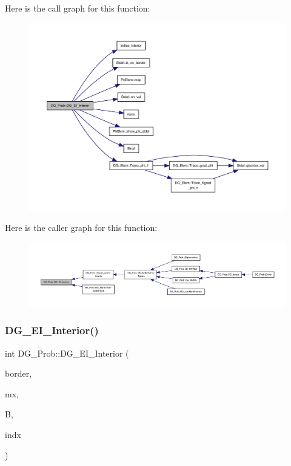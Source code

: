 Here is the call graph for this function\+:
\nopagebreak
\begin{figure}[H]
\begin{center}
\leavevmode
\includegraphics[width=350pt]{classDG__Prob_a862dcc9991b9091de30323b1d2b1c5a5_cgraph}
\end{center}
\end{figure}
Here is the caller graph for this function\+:
\nopagebreak
\begin{figure}[H]
\begin{center}
\leavevmode
\includegraphics[width=350pt]{classDG__Prob_a862dcc9991b9091de30323b1d2b1c5a5_icgraph}
\end{center}
\end{figure}
\mbox{\label{classDG__Prob_ac3054c910c2a6465c71f208b0e2b79ff}} 
\subsubsection{\texorpdfstring{D\+G\+\_\+\+E\+I\+\_\+\+Interior()}{DG\_EI\_Interior()}\hspace{0.1cm}{\footnotesize\ttfamily [2/2]}}
{\footnotesize\ttfamily int D\+G\+\_\+\+Prob\+::\+D\+G\+\_\+\+E\+I\+\_\+\+Interior (\begin{DoxyParamCaption}\item[{const \hyperlink{structEDGE}{E\+D\+GE}}]{border,  }\item[{double $\ast$}]{mx,  }\item[{double $\ast$}]{B,  }\item[{int $\ast$}]{indx }\end{DoxyParamCaption})}



